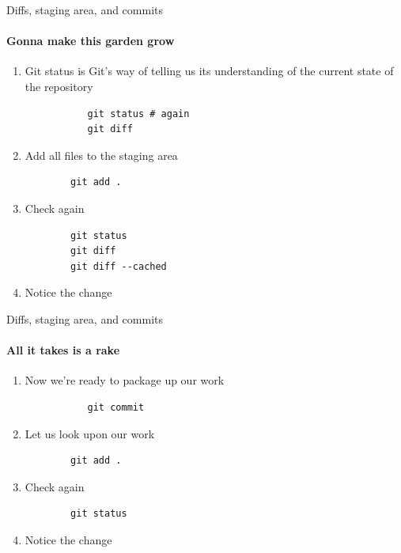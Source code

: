 \documentclass[pdf]{beamer} %
\begin{document}
\begin{frame}[fragile]{Diffs, staging area, and commits}
    \framesubtitle{Gonna make this garden grow}
   \begin{enumerate}
       \item Git status is Git's way of telling us its understanding of the current state of the repository
       \begin{verbatim}
           git status # again
           git diff
       \end{verbatim}
        \item Add all files to the staging area
		\begin{verbatim}
        git add . 
		\end{verbatim}
        \item Check again
		\begin{verbatim}
        git status
        git diff
        git diff --cached
		\end{verbatim}
        \item Notice the change
   \end{enumerate} 
\end{frame}

\begin{frame}[fragile]{Diffs, staging area, and commits}
    \framesubtitle{All it takes is a rake}
   \begin{enumerate}
       \item Now we're ready to package up our work
       \begin{verbatim}
           git commit
       \end{verbatim}
        \item Let us look upon our work
		\begin{verbatim}
        git add . 
		\end{verbatim}
        \item Check again
		\begin{verbatim}
        git status
		\end{verbatim}
        \item Notice the change
   \end{enumerate} 
\end{frame}
\end{document}
